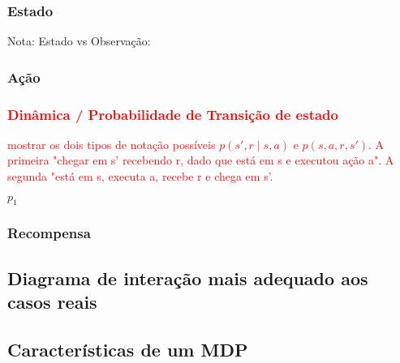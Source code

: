 \documentclass{article}
\begin{document}
        \subsubsection{Estado}
        
            
            Nota: Estado vs Observação: 
            
        \subsubsection{Ação}
        
            
        \subsubsection{\textcolor{red}{Dinâmica / Probabilidade de Transição de estado}}
        
            \textcolor{red}{mostrar os dois tipos de notação possíveis $p(s', r \mid s, a)$ e $p(s, a, r, s')$. A primeira "chegar em s' recebendo r, dado que está em s e executou ação a". A segunda "está em s, executa a, recebe r e chega em s'.}
    
            $p_1$
            
        \subsubsection{Recompensa}
    
            
    \subsection{Diagrama de interação mais adequado aos casos reais}
    
        
    
    \subsection{Características de um MDP}
    
\end{document}
